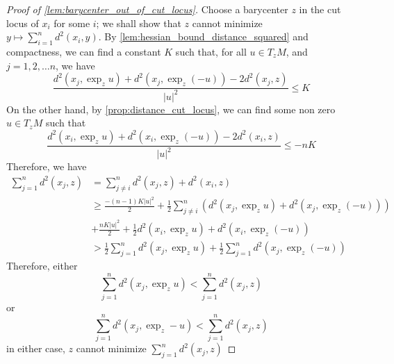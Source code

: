 \begin{proof}[Proof of \cref{lem:barycenter_out_of_cut_locus}]
	Choose a barycenter \( z \) in the cut locus of \( x _ { i } \) for some \( i \);
	we shall show that \( z \) cannot minimize
	\( y \mapsto \sum _ { i = 1 } ^ { n } d ^ { 2 } \left( x _ { i } , y \right) \).
	By \cref{lem:hessian_bound_distance_squared} and compactness,
	we can find a constant \( K \) such that, for all \( u \in T _ { z } M \),
	and \( j = 1,2 , \ldots n \), we have
	\[
		\frac { d ^ { 2 } \left( x _ { j } , \exp _ { z } u \right) + d ^ { 2 } \left( x _ { j } , \exp _ { z } ( - u ) \right) - 2 d ^ { 2 } \left( x _ { j } , z \right) }
		{ | u | ^ { 2 } } \leq K
	\]
	On the other hand, by \cref{prop:distance_cut_locus},
	we can find some non
	zero \( u \in T _ { z } M \) such that
	\[
		\frac { d ^ { 2 } \left( x _ { i } , \exp _ { z } u \right) + d ^ { 2 } \left( x _ { i } , \exp _ { z } ( - u ) \right) - 2 d ^ { 2 } \left( x _ { i } , z \right) } { | u | ^ { 2 } } \leq - n K
	\]
	Therefore, we have
	\begin{align*}
		\sum _ { j = 1 } ^ { n } d ^ { 2 } \left( x _ { j } , z \right) & = \sum _ { j \neq i } ^ { n } d ^ { 2 } \left( x _ { j } , z \right) + d ^ { 2 } \left( x _ { i } , z \right)                                                                                                                   \\
		                                                                & \geq \frac { - ( n - 1 ) K | u | ^ { 2 } } { 2 } + \frac { 1 } { 2 } \sum _ { j \neq i } ^ { n } \left( d ^ { 2 } \left( x _ { j } , \exp _ { z } u \right) + d ^ { 2 } \left( x _ { j } , \exp _ { z } ( - u ) \right) \right) \\
		                                                                & + \frac { n K | u | ^ { 2 } } { 2 } + \frac { 1 } { 2 } d ^ { 2 } \left( x _ { i } , \exp _ { z } u \right) + d ^ { 2 } \left( x _ { i } , \exp _ { z } ( - u ) \right)                                                         \\
		                                                                & > \frac { 1 } { 2 } \sum _ { j = 1 } ^ { n } d ^ { 2 } \left( x _ { j } , \exp _ { z } u \right) + \frac { 1 } { 2 } \sum _ { j = 1 } ^ { n } d ^ { 2 } \left( x _ { j } , \exp _ { z } ( - u ) \right)
	\end{align*}
	Therefore, either
	\[ \sum _ { j = 1 } ^ { n } d ^ { 2 } \left( x _ { j } , \exp _ { z } u \right) < \sum _ { j = 1 } ^ { n } d ^ { 2 } \left( x _ { j } , z \right) \]
	or
	\[ \sum _ { j = 1 } ^ { n } d ^ { 2 } \left( x _ { j } , \exp _ { z } - u \right) < \sum _ { j = 1 } ^ { n } d ^ { 2 } \left( x _ { j } , z \right) \]
	in either case, \( z \) cannot minimize \( \sum _ { j = 1 } ^ { n } d ^ { 2 } \left( x _ { j } , z \right) \)
\end{proof}
